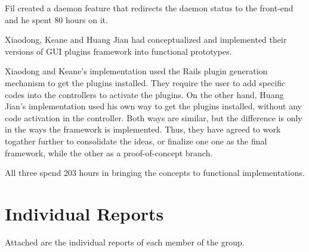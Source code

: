 \documentclass{article}
\begin{document}
Fil created a daemon feature that redirects the daemon status to the front-end and he spent 80 hours on it.

Xiaodong, Keane and Huang Jian had conceptualized and implemented their versions of GUI plugins framework into functional prototypes.

Xiaodong and Keane's implementation used the Rails plugin generation mechanism to get the plugins installed. They require the user to add specific codes into the controllers to activate the plugins. On the other hand, Huang Jian's implementation used his own way to get the plugins installed, without any code activation in the controller. Both ways are similar, but the difference is only in the ways the framework is implemented. Thus, they have agreed to work togather further to consolidate the ideas, or finalize one one as the final framework, while the other as a proof-of-concept branch. 

All three spend 203 hours in bringing the concepts to functional implementations. 
 
\section*{Individual Reports}

Attached are the individual reports of each member of the group. 














\end{document}
